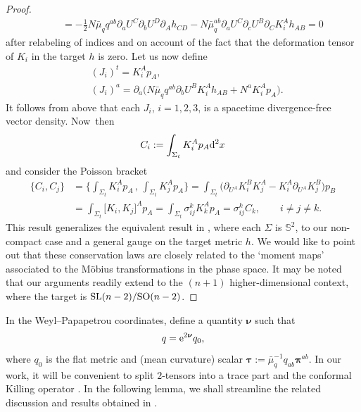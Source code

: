 \documentclass[pdftex]{sigma}
\def\ptl{\partial}%
\def\mbo#1{\boldsymbol{#1}}%
\def\halb{\frac{1}{2}}%
\numberwithin{equation}{section}
\begin{document}
\begin{proof}
\begin{gather*}
\qquad{}= -\halb N \bar{\mu}_q q^{ab} \ptl_a U^C \ptl_b U^D \ptl_A h_{CD}- N \bar{\mu}_q^{ab} \ptl_a U^C \ptl_c U^B \ptl_C K_i^A h_{AB} = 0
\end{gather*}
after relabeling of indices and on account of the fact that the deformation tensor of $K_i$ in the target $h$ is zero. Let us now define
\begin{align*}
&(J_i)^t = K^A_i p_A,\\
&(J_i)^a = \ptl_a \bigl(N \bar{\mu}_q q^{ab} \ptl_b U^B K_i^A h_{AB} + N^a K_i^A p_A\bigr).
\end{align*}
It follows from above that each $J_i$, $i = 1, 2, 3$, is a spacetime divergence-free vector density. Now~then
\begin{align*}
C_i := \int_{\Sigma_t}K_i^A p_A {\rm d}^2 x
\end{align*}
and consider the Poisson bracket
\begin{align*}
\{ C_i, C_j \} &{}= \biggl\{ \int_{\Sigma_t} K^A_i p_A \,,\, \int_{\Sigma_t} K^A_j p_A \biggr\}
= \int_{\Sigma_t} \bigl(\ptl_{U^A} K^B_i K^A_j - K^A_i \ptl_{U^A} K^B_j \bigr) p_B \\
&{}= \int_{\Sigma_t} \bigl[K_i, K_j \bigr]^A p_A = \int_{\Sigma_t} \sigma^k_{ij} K^A_k p_A
= \sigma^k_{ij} C_k, \qquad i \neq j \neq k.
\end{align*}
This result generalizes the equivalent result in \cite{kaluz1}, where each $\Sigma$ is $\mathbb{S}^2$, to our non-compact case and a general gauge on the target metric $h$. We would like to point out that these conservation laws are closely related to the `moment maps' associated to the M\"obius transformations in the phase space. It may be noted that our arguments readily extend to the $(n+1)$ higher-dimensional context, where the target is ${\rm SL}(n-2)/{\rm SO}(n-2)$.
\end{proof}

In the Weyl--Papapetrou coordinates, define a quantity $\mbo{\nu}$ such that
\begin{align} \label{conformal}
q= {\rm e}^{2\mbo{\nu}} q_0,
\end{align}
where $q_0$ is the flat metric and (mean curvature) scalar $\mbo{\tau} := \bar{\mu}^{-1}_q q_{ab} \mbo{\pi}^{ab}$. In our work, it will be convenient to split $2$-tensors into a trace part and the conformal Killing operator \cite{kaluz1}. In the following lemma, we shall streamline the related discussion and results obtained in \cite{kaluz1}.
\end{document}
